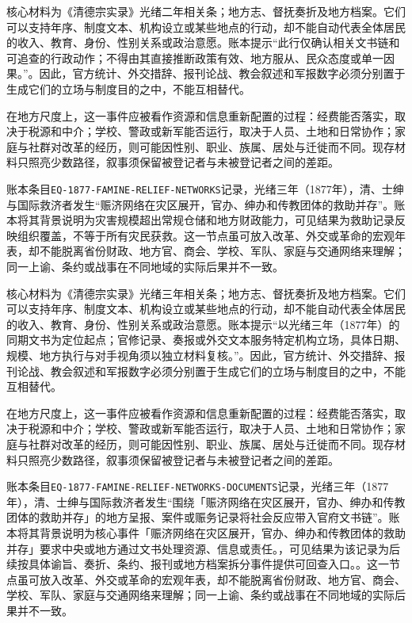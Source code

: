 核心材料为《清德宗实录》光绪二年相关条；地方志、督抚奏折及地方档案。它们可以支持年序、制度文本、机构设立或某些地点的行动，却不能自动代表全体居民的收入、教育、身份、性别关系或政治意愿。账本提示“此行仅确认相关文书链和可追查的行政动作；不得由其直接推断政策有效、地方服从、民众态度或单一因果。”。因此，官方统计、外交措辞、报刊论战、教会叙述和军报数字必须分别置于生成它们的立场与制度目的之中，不能互相替代。

在地方尺度上，这一事件应被看作资源和信息重新配置的过程：经费能否落实，取决于税源和中介；学校、警政或新军能否运行，取决于人员、土地和日常协作；家庭与社群对改革的经历，则可能因性别、职业、族属、居处与迁徙而不同。现存材料只照亮少数路径，叙事须保留被登记者与未被登记者之间的差距。

账本条目\texttt{EQ-1877-FAMINE-RELIEF-NETWORKS}记录，光绪三年（1877年），清、士绅与国际救济者发生“赈济网络在灾区展开，官办、绅办和传教团体的救助并存”。账本将其背景说明为灾害规模超出常规仓储和地方财政能力，可见结果为救助记录反映组织覆盖，不等于所有灾民获救。这一节点虽可放入改革、外交或革命的宏观年表，却不能脱离省份财政、地方官、商会、学校、军队、家庭与交通网络来理解；同一上谕、条约或战事在不同地域的实际后果并不一致。

核心材料为《清德宗实录》光绪三年相关条；地方志、督抚奏折及地方档案。它们可以支持年序、制度文本、机构设立或某些地点的行动，却不能自动代表全体居民的收入、教育、身份、性别关系或政治意愿。账本提示“以光绪三年（1877年）的同期文书为定位起点；官修记录、奏报或外交文本服务特定机构立场，具体日期、规模、地方执行与对手视角须以独立材料复核。”。因此，官方统计、外交措辞、报刊论战、教会叙述和军报数字必须分别置于生成它们的立场与制度目的之中，不能互相替代。

在地方尺度上，这一事件应被看作资源和信息重新配置的过程：经费能否落实，取决于税源和中介；学校、警政或新军能否运行，取决于人员、土地和日常协作；家庭与社群对改革的经历，则可能因性别、职业、族属、居处与迁徙而不同。现存材料只照亮少数路径，叙事须保留被登记者与未被登记者之间的差距。

账本条目\texttt{EQ-1877-FAMINE-RELIEF-NETWORKS-DOCUMENTS}记录，光绪三年（1877年），清、士绅与国际救济者发生“围绕「赈济网络在灾区展开，官办、绅办和传教团体的救助并存」的地方呈报、案件或赈务记录将社会反应带入官府文书链”。账本将其背景说明为核心事件「赈济网络在灾区展开，官办、绅办和传教团体的救助并存」要求中央或地方通过文书处理资源、信息或责任。，可见结果为该记录为后续按具体谕旨、奏折、条约、报刊或地方档案拆分事件提供可回查入口。。这一节点虽可放入改革、外交或革命的宏观年表，却不能脱离省份财政、地方官、商会、学校、军队、家庭与交通网络来理解；同一上谕、条约或战事在不同地域的实际后果并不一致。

